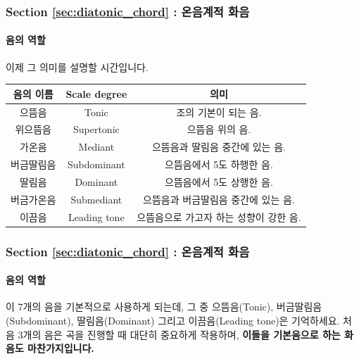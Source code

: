 \documentclass{beamer}
\begin{document}
	\begin{frame}
		\frametitle{Section \ref{sec:diatonic_chord} : 온음계적 화음}
		\framesubtitle{음의 역할}
		이제 그 의미를 설명할 시간입니다.
		\begin{table}[!h]
			\centering
			\small
			\begin{tabular}{|c|c|c|}
				\hline
				음의 이름 & Scale degree & 의미 \\ \hline
				으뜸음 & Tonic & 조의 기본이 되는 음.\\ \hline
				위으뜸음 & Supertonic & 으뜸음 위의 음.\\ \hline
				가온음 & Mediant & 으뜸음과 딸림음 중간에 있는 음.\\ \hline
				버금딸림음 & Subdominant & 으뜸음에서 5도 하행한 음. \\ \hline
				딸림음 & Dominant & 으뜸음에서 5도 상행한 음.\\ \hline
				버금가온음 & Submediant & 으뜸음과 버금딸림음 중간에 있는 음.\\ \hline
				이끔음 & Leading tone & 으뜸음으로 가고자 하는 성향이 강한 음.\\ \hline
			\end{tabular}
		\end{table}
	\end{frame}
	
	\begin{frame}
		\frametitle{Section \ref{sec:diatonic_chord} : 온음계적 화음}
		\framesubtitle{음의 역할}
		이 7개의 음을 기본적으로 사용하게 되는데, 그 중 으뜸음(Tonic), 버금딸림음(Subdominant), 딸림음(Dominant) 그리고 이끔음(Leading tone)은 기억하세요. 처음 3개의 음은 곡을 진행할 때 대단히 중요하게 작용하며, {\bf 이들을 기본음으로 하는 화음도 마찬가지입니다.}
	\end{frame}
	
\end{document}
